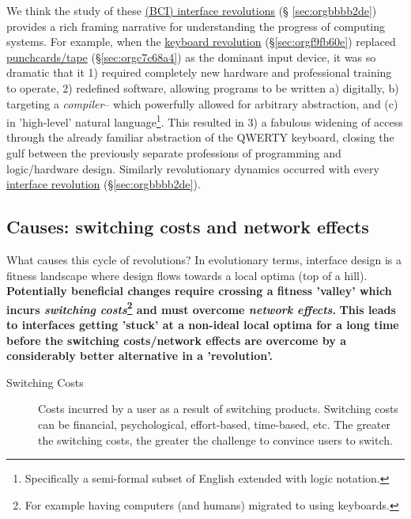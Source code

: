 \documentclass[logo,bsc,singlespacing,parskip]{infthesis}
\begin{document}
We think the study of these \hyperref[sec:orgbbbb2de]{(BCI) interface revolutions} (§  \ref{sec:orgbbbb2de}) provides a rich framing narrative for understanding the progress of computing systems.
For example, when the \hyperref[sec:orgf9fb60e]{keyboard revolution} (\S \ref{sec:orgf9fb60e}) replaced  \hyperref[sec:orgc7c68a4]{punchcards/tape} (\S \ref{sec:orgc7c68a4}) as the dominant input device, it was so dramatic that it 1) required completely new hardware and professional training to operate, 2) redefined software, allowing programs to be written a) digitally, b) targeting a \emph{compiler}-- which powerfully allowed for arbitrary abstraction, and (c) in 'high-level' natural language\footnote{Specifically a semi-formal subset of English extended with logic notation.}. This resulted in 3) a fabulous widening of access through the already familiar abstraction of the QWERTY keyboard, closing the gulf between the previously separate professions of programming and logic/hardware design.
Similarly revolutionary dynamics occurred with every \hyperref[sec:orgbbbb2de]{interface revolution} (\S \ref{sec:orgbbbb2de}).
\subsection{Causes: switching costs and network effects}
\label{sec:org61d0814}
What causes this cycle of revolutions?
In evolutionary terms, interface design is a fitness landscape where design flows towards a local optima (top of a hill).
\textbf{Potentially beneficial changes require crossing a fitness 'valley' which incurs \emph{switching costs}\footnote{For example having computers (and humans) migrated to using keyboards.} and must overcome \emph{network effects}.}
\textbf{This leads to interfaces getting 'stuck' at a non-ideal local optima for a long time before the switching costs/network effects are overcome by a considerably better alternative in a 'revolution'.}

\begin{mdframed}
\begin{description}
\item[{Switching Costs\label{switching costs}}] Costs incurred by a user as a result of switching products.
Switching costs can be financial, psychological, effort-based, time-based, etc.
The greater the switching costs, the greater the challenge to convince users to switch.
\end{description}
\end{mdframed}
\end{document}
